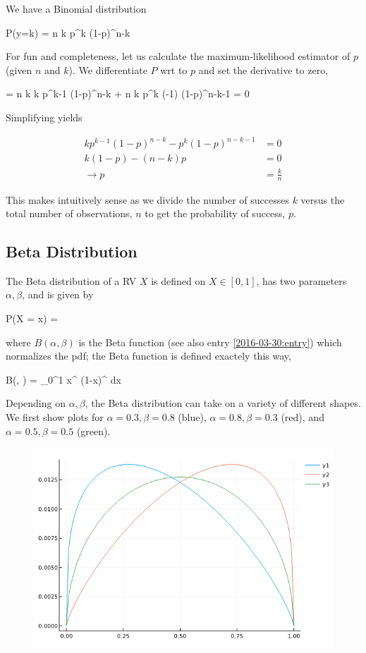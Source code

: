 
We have a Binomial distribution 

\bee
P(y=k) = {n \choose k} p^k (1-p)^{n-k}
\eee

For fun and completeness, let us calculate the maximum-likelihood estimator of $p$ (given $n$ and $k$). We differentiate $P$ wrt to $p$ and set the derivative to zero,

\bee
{} = {n \choose k} k p^{k-1} (1-p)^{n-k} + {n \choose k} p^k (-1) (1-p)^{n-k-1} = 0
\eee

Simplifying yields

\begin{align*}
k p^{k-1} (1-p)^{n-k} - p^k (1-p)^{n-k-1} & = 0 \\
k(1-p) - (n-k)p &= 0 \\
\rightarrow p &= \frac{k}{n}
\end{align*}

This makes intuitively sense as we divide the number of successes $k$ versus the total number of observations, $n$ to get the probability of success, $p$.

\subsection{Beta Distribution}

The Beta distribution of a RV $X$ is defined on $X \in [0,1]$, has two parameters $\alpha, \beta$, and is given by

\bee
P(X = x) = 
\eee

where $B(\alpha, \beta)$ is the Beta function (see also entry \ref{2016-03-30:entry}) which normalizes the pdf; the Beta function is defined exactely this way,

\bee
B(\alpha, \beta) = \int_0^1 x^{} (1-x)^{} dx
\eee

Depending on $\alpha, \beta$, the Beta distribution can take on a variety of different shapes. We first show plots for $\alpha=0.3, \beta=0.8$ (blue), $\alpha=0.8, \beta=0.3$ (red), and $\alpha=0.5, \beta=0.5$ (green).

\begin{figure}[hbt!]
\centering
\includegraphics[scale=0.5]{images/beta_dist_1.png}
\end{figure}

